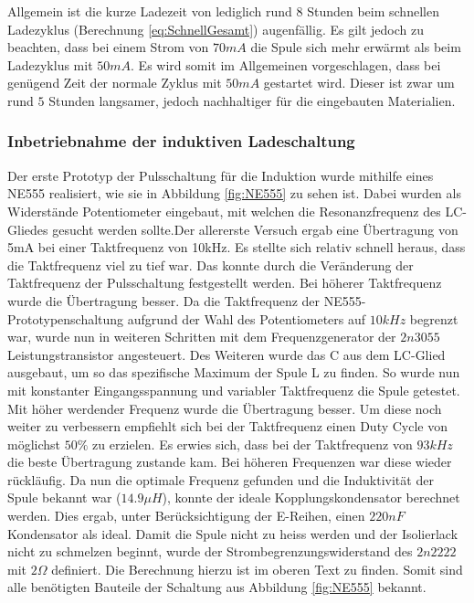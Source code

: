 Allgemein ist die kurze Ladezeit von lediglich rund $8$ Stunden beim schnellen Ladezyklus (Berechnung \ref{eq:SchnellGesamt}) augenfällig. Es gilt jedoch zu beachten, dass bei einem Strom von $70mA$ die Spule sich mehr erwärmt als beim Ladezyklus mit $50mA$. Es wird somit im Allgemeinen vorgeschlagen, dass bei genügend Zeit der normale Zyklus mit $50mA$ gestartet wird. Dieser ist zwar um rund $5$ Stunden langsamer, jedoch nachhaltiger für die eingebauten Materialien.


\subsubsection*{Inbetriebnahme der induktiven Ladeschaltung}\label{sec:erkenntnisse}

Der erste Prototyp der Pulsschaltung für die Induktion wurde mithilfe eines NE555 realisiert, wie sie in Abbildung \ref{fig:NE555} zu sehen ist. Dabei wurden als Widerstände Potentiometer eingebaut, mit welchen die Resonanzfrequenz des LC-Gliedes gesucht werden sollte.Der allererste Versuch ergab eine Übertragung von 5mA bei einer Taktfrequenz von 10kHz. Es stellte sich relativ schnell heraus, dass die Taktfrequenz viel zu tief war. Das konnte durch die Veränderung der Taktfrequenz der Pulsschaltung festgestellt werden. Bei höherer Taktfrequenz wurde die Übertragung besser. Da die Taktfrequenz der NE555-Prototypenschaltung aufgrund der Wahl des Potentiometers auf $10kHz$ begrenzt war, wurde nun in weiteren Schritten mit dem Frequenzgenerator der $2n3055$ Leistungstransistor angesteuert. Des Weiteren wurde das C aus dem LC-Glied ausgebaut, um so das spezifische Maximum der Spule L zu finden. So wurde nun mit konstanter Eingangsspannung und variabler Taktfrequenz die Spule getestet. Mit höher werdender Frequenz wurde die Übertragung besser. Um diese noch weiter zu verbessern empfiehlt sich bei der Taktfrequenz einen Duty Cycle von möglichst $50\%$ zu erzielen. Es erwies sich, dass bei der Taktfrequenz von $93kHz$ die beste Übertragung zustande kam. Bei höheren Frequenzen war diese wieder rückläufig. Da nun die optimale Frequenz gefunden und die Induktivität der Spule bekannt war ($14.9\mu H$), konnte der ideale Kopplungskondensator berechnet werden. Dies ergab, unter Berücksichtigung der E-Reihen, einen $220nF$ Kondensator als ideal. Damit die Spule nicht zu heiss werden und der Isolierlack nicht zu schmelzen beginnt, wurde der Strombegrenzungswiderstand des $2n2222$ mit $2\Omega$ definiert. Die Berechnung hierzu ist im oberen Text zu finden. Somit sind alle benötigten Bauteile der Schaltung aus Abbildung \ref{fig:NE555} bekannt.

